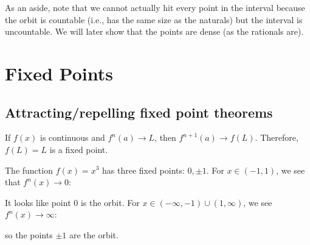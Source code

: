 \documentclass[class=pmath370,tikz,notes]{agony}
\begin{document}
As an aside, note that we cannot actually hit every point in the interval
because the orbit is countable (i.e., has the same size as the naturals)
but the interval is uncountable.
We will later show that the points are dense (as the rationals are).

\chapter{Fixed Points}

\section{Attracting/repelling fixed point theorems}

\begin{remark}
  If $f(x)$ is continuous and $f^n(a) \to L$, then $f^{n+1}(a) \to f(L)$.
  Therefore, $f(L) = L$ is a fixed point.
\end{remark}

\begin{example}
  The function $f(x) = x^3$ has three fixed points: $0, \pm1$.
  For $x \in (-1,1)$, we see that $f^n(x) \to 0$:
  \begin{center}
    \quad
  \end{center}
  It looks like point 0 is  the orbit.
  For $x \in (-\infty,-1)\cup(1,\infty)$, we see $f^n(x) \to \infty$:
  \begin{center}
    \quad
  \end{center}
  so the points $\pm1$ are  the orbit.
\end{example}
\end{document}
